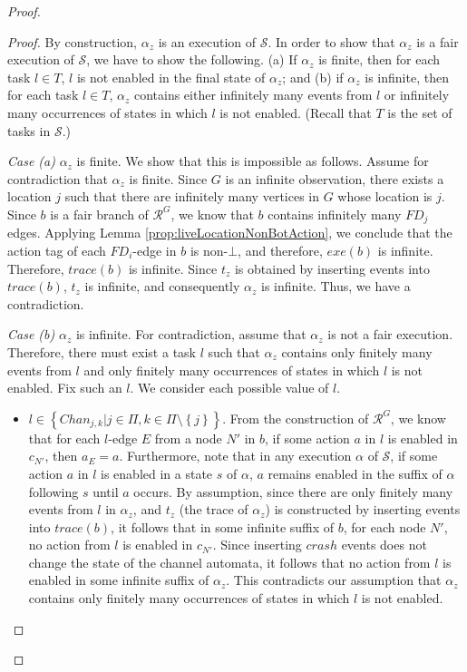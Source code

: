 \documentclass[11pt]{article}
\numberwithin{theorem}{section}
\newcommand{\set}[1]{\left\{#1\right\}}
\begin{document}
\begin{proof}
\begin{proof}
By construction, $\alpha_z$ is an execution of $\mathcal{S}$. In order to show that $\alpha_z$ is a fair execution of $\mathcal{S}$, we have to show the following. 
(a) If $\alpha_z$ is finite, then for each task $l \in T$, $l$ is not enabled in the final state of $\alpha_z$; and (b) if $\alpha_z$ is infinite, then for each task $l \in T$, $\alpha_z$ contains either infinitely many events from $l$ or infinitely many occurrences of states in which $l$ is not enabled. (Recall that $T$ is the set of tasks in $\mathcal{S}$.)

\emph{Case (a)} $\alpha_z$ is finite. We show that this is impossible as follows. Assume for contradiction that $\alpha_z$ is finite. Since $G$ is an infinite observation, there exists a location $j$ such that there are infinitely many vertices in $G$ whose location is $j$. Since $b$ is a fair branch of $\mathcal{R}^G$,  we know that $b$ contains infinitely many $FD_j$ edges. Applying Lemma \ref{prop:liveLocationNonBotAction}, we conclude that the action tag of each $FD_i$-edge in $b$ is non-$\bot$, and therefore, $exe(b)$ is infinite. Therefore, $trace(b)$ is infinite. Since $t_z$ is obtained by inserting events into $trace(b)$, $t_z$ is infinite, and consequently $\alpha_z$ is infinite. Thus, we have a contradiction.

\emph{Case (b)} $\alpha_z$ is infinite. For contradiction, assume that $\alpha_z$ is not a fair execution. Therefore, there must exist a task $l$ such that  $\alpha_z$ contains only finitely many events from $l$ and only finitely many occurrences of states in which $l$ is not enabled. Fix such an $l$. We consider each possible value of $l$.

\begin{itemize}
\item $l \in \set{Chan_{j,k} | j \in \Pi, k \in \Pi \setminus \set{j}}$. From the construction of $\mathcal{R}^G$, we know that for each $l$-edge $E$ from a node $N'$ in $b$, if some action $a$ in $l$ is enabled in $c_{N'}$, then $a_E = a$. Furthermore, note that in any execution $\alpha$ of $\mathcal{S}$, if some action $a$ in $l$ is enabled in a state $s$ of $\alpha$, $a$ remains enabled in the suffix of $\alpha$ following $s$ until $a$ occurs. By assumption, since there are only finitely many events from $l$ in $\alpha_z$, and $t_z$ (the trace of $\alpha_z$) is constructed by inserting events into $trace(b)$, it follows that in some infinite suffix of $b$, for each node $N'$, no action from $l$ is enabled in $c_{N'}$. Since inserting $crash$ events does not change the state of the channel automata, it follows that no action from $l$ is enabled in some infinite suffix of $\alpha_z$. This contradicts our assumption that $\alpha_z$ contains only finitely many occurrences of states in which $l$ is not enabled.


\end{itemize}
\end{proof}
\end{proof}
\end{document}
